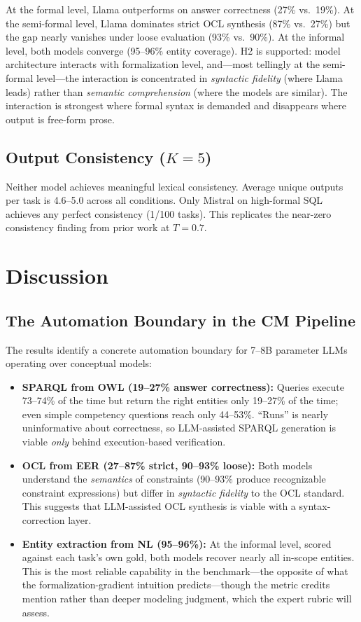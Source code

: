 \documentclass[runningheads]{llncs}
\begin{document}
At the formal level, Llama outperforms on answer correctness (27\% vs.\ 19\%). At the semi-formal level, Llama dominates strict OCL synthesis (87\% vs.\ 27\%) but the gap nearly vanishes under loose evaluation (93\% vs.\ 90\%). At the informal level, both models converge (95--96\% entity coverage). H2 is supported: model architecture interacts with formalization level, and---most tellingly at the semi-formal level---the interaction is concentrated in \emph{syntactic fidelity} (where Llama leads) rather than \emph{semantic comprehension} (where the models are similar). The interaction is strongest where formal syntax is demanded and disappears where output is free-form prose.

\subsection{Output Consistency ($K\!=\!5$)}

Neither model achieves meaningful lexical consistency. Average unique outputs per task is 4.6--5.0 across all conditions. Only Mistral on high-formal SQL achieves any perfect consistency (1/100 tasks). This replicates the near-zero consistency finding from prior work at $T\!=\!0.7$.

\section{Discussion}
\label{sec:discussion}

\subsection{The Automation Boundary in the CM Pipeline}

The results identify a concrete automation boundary for 7--8B parameter LLMs operating over conceptual models:

\begin{itemize}[noitemsep]
  \item \textbf{SPARQL from OWL (19--27\% answer correctness):} Queries execute 73--74\% of the time but return the right entities only 19--27\% of the time; even simple competency questions reach only 44--53\%. ``Runs'' is nearly uninformative about correctness, so LLM-assisted SPARQL generation is viable \emph{only} behind execution-based verification.
  \item \textbf{OCL from EER (27--87\% strict, 90--93\% loose):} Both models understand the \emph{semantics} of constraints (90--93\% produce recognizable constraint expressions) but differ in \emph{syntactic fidelity} to the OCL standard. This suggests that LLM-assisted OCL synthesis is viable with a syntax-correction layer.
  \item \textbf{Entity extraction from NL (95--96\%):} At the informal level, scored against each task's own gold, both models recover nearly all in-scope entities. This is the most reliable capability in the benchmark---the opposite of what the formalization-gradient intuition predicts---though the metric credits mention rather than deeper modeling judgment, which the expert rubric will assess.
\end{itemize}
\end{document}
